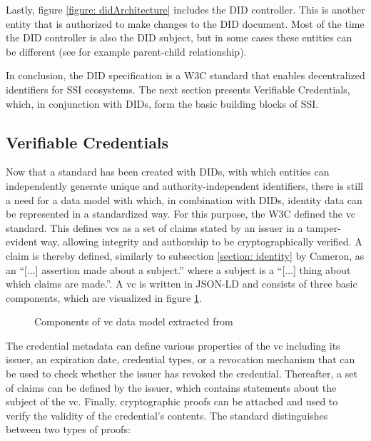         Lastly, figure \ref{figure: didArchitecture} includes the \ac{DID} controller. This is another entity that is authorized to make changes to the \ac{DID} document. Most of the time the \ac{DID} controller is also the \ac{DID} subject, but in some cases these entities can be different (see for example parent-child relationship). \cite{sporny_decentralized_2021}
        
        In conclusion, the \ac{DID} specification is a W3C standard that enables decentralized identifiers for \ac{SSI} ecosystems. The next section presents Verifiable Credentials, which, in conjunction with \acp{DID}, form the basic building blocks of \ac{SSI}.
	    
	    \subsection{Verifiable Credentials}\label{subsection: vc}
	    
	    Now that a standard has been created with \acp{DID}, with which entities can independently generate unique and authority-independent identifiers, there is still a need for a data model with which, in combination with \acp{DID}, identity data can be represented in a standardized way. For this purpose, the W3C defined the \acf{vc} standard. This defines \acp{vc} as a set of claims stated by an issuer in a tamper-evident way, allowing integrity and authorship to be cryptographically verified. A claim is thereby defined, similarly to subsection \ref{section: identity} by Cameron, as an “[...] assertion made about a subject.” where a subject is a “[...] thing about which claims are made.”. A \ac{vc} is written in JSON-LD and consists of three basic components, which are visualized in figure \ref{figure: vc components}. \cite{sporny_verifiable_2019}
	    
	    \begin{figure}[ht]
    	    \centering
    	    \makebox[\textwidth]{}
            \caption[Components of \ac{vc} data model]{Components of \ac{vc} data model extracted from \cite{sporny_verifiable_2019}}
            \label{figure: vc components}
        \end{figure}
        
        The credential metadata can define various properties of the \ac{vc} including its issuer, an expiration date, credential types, or a revocation mechanism that can be used to check whether the issuer has revoked the credential. Thereafter, a set of claims can be defined by the issuer, which contains statements about the subject of the \ac{vc}. Finally, cryptographic proofs can be attached and used to verify the validity of the credential's contents. The standard distinguishes between two types of proofs: \cite{sporny_verifiable_2019}
        
